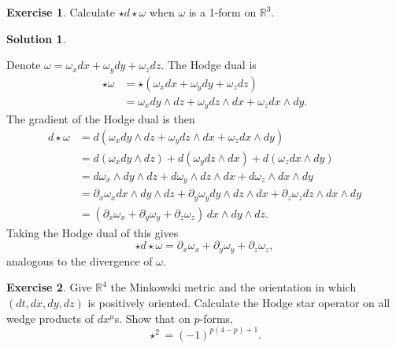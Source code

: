 \documentclass[11pt, a4paper]{article}
\theoremstyle{definition}
\newtheorem{ex}{Exercise}[part]
\newtheorem{sol}{Solution}[part]
\begin{document}
\begin{ex}

Calculate $\star d \star \omega$ when $\omega$ is a 1-form on $\mathbb{R}^3$.

\end{ex}

\begin{sol}\label{sol:divergence1form}

Denote $\omega = \omega_x dx + \omega_y dy + \omega_z dz$. The Hodge dual is
\begin{align*}
    \star \omega &= \star (\omega_x dx + \omega_y dy + \omega_z dz) \\
        &= \omega_x dy \wedge dz + \omega_y dz \wedge dx + \omega_z dx \wedge dy.
\end{align*}
The gradient of the Hodge dual is then
\begin{align*}
    d \star \omega &= d(\omega_x dy \wedge dz + \omega_y dz \wedge dx + \omega_z dx \wedge dy) \\
        &= d(\omega_x dy \wedge dz) + d(\omega_y dz \wedge dx) + d(\omega_z dx \wedge dy) \\
        &= d\omega_x \wedge dy \wedge dz + d\omega_y \wedge dz \wedge dx + d\omega_z \wedge dx \wedge dy \\
        &= \partial_x \omega_x dx \wedge dy \wedge dz + \partial_y \omega_y dy \wedge dz \wedge dx + \partial_z \omega_z dz \wedge dx \wedge dy \\
        &= (\partial_x \omega_x + \partial_y \omega_y + \partial_z \omega_z) \, dx \wedge dy \wedge dz.
\end{align*}
Taking the Hodge dual of this gives
\[
    \star d \star \omega = \partial_x \omega_x + \partial_y \omega_y + \partial_z \omega_z,
\]
analogous to the divergence of $\omega$.

\end{sol}

\begin{ex}

Give $\mathbb{R}^4$ the Minkowski metric and the orientation in which $(dt, dx, dy, dz)$ is positively oriented. Calculate the Hodge star operator on all wedge products of $dx^\mu$s. Show that on $p$-forms,
\[
    \star^2 = {(-1)}^{p (4 - p) + 1}.
\]

\end{ex}
\end{document}
